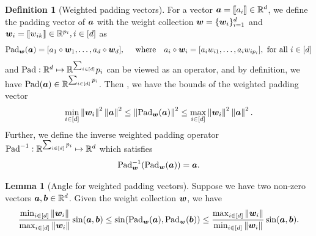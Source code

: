 \documentclass[lettersize,onecolumn,journal]{IEEEtran}
\theoremstyle{definition}
\newtheorem{lem}{Lemma}
\theoremstyle{definition}
\newtheorem{defn}{Definition}
\begin{document}
\begin{defn}[Weighted padding vectors]\label{def:pad} For a vector $\bm{a} = \llbracket a_i \rrbracket \in \mathbb{R}^d$, we define the padding vector of $\bm{a}$ with the weight collection $\bm{w} = \{\bm{w}_i\}_{i = 1}^d$ and $\bm{w}_i = \llbracket w_{ik} \rrbracket \in \mathbb{R}^{p_i}, i \in [d]$ as
\begin{equation}
    \text{Pad}_{\bm{w}}(\bm{a}) = [a_1 \circ \bm{w}_1, \ldots, a_d \circ \bm{w}_d], \quad \text{ where} \quad  a_i \circ \bm{w}_i = [a_i w_{i1},\ldots, a_i w_{i p_i}], \text{ for all } i \in [d]
\end{equation}
and $\text{Pad}: \mathbb{R}^{d}\mapsto \mathbb{R}^{\sum_{i\in[d]}}p_i$ can be viewed as an operator, and by definition, we have $\text{Pad} (\bm{a}) \in \mathbb{R}^{\sum_{i \in[d]} p_i}$. Then , we have the bounds of the weighted padding vector
\begin{equation}\label{eq:pad_bound}
     \min_{i \in [d]} \onorm{\mw_i}^2 \onorm{\ma}^2 \leq \onorm{\pad_{\mw}(\ma)}^2 \leq \max_{i \in [d]} \onorm{\mw_i}^2 \onorm{\ma}^2.
\end{equation}
Further, we define the inverse weighted padding operator $\text{Pad}^{-1}: \mathbb{R}^{\sum_{i\in[d]}p_i}\mapsto \mathbb{R}^d$ which satisfies 
\begin{equation}
    \text{Pad}^{-1}_{\bm{w}}(\text{Pad}_{\bm{w}}(\bm{a})) = \bm{a}.
\end{equation}
\end{defn}

\begin{lem}[Angle for weighted padding vectors]\label{lem:pad} Suppose we have two non-zero vectors $\bm{a}, \bm{b} \in \mathbb{R}^d$. Given the weight collection $\bm{w}$, we have 
\begin{equation}
   \frac{\min_{i \in [d]} \left\lVert\bm{w}_i\right\rVert}{\max_{i \in [d]} \left\lVert\bm{w}_i\right\rVert } \sin (\bm{a}, \bm{b}) \leq \sin(\text{Pad}_{\bm{w}}(\bm{a}),  \text{Pad}_{\bm{w}}(\bm{b})) \leq \frac{ \max_{i \in [d]} \left\lVert\bm{w}_i\right\rVert }{\min_{i \in [d]} \left\lVert\bm{w}_i\right\rVert} \sin (\bm{a}, \bm{b}).
\end{equation}
\end{lem}
\end{document}
